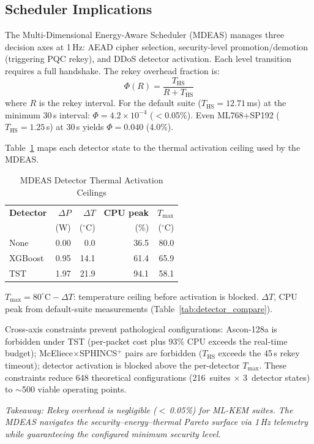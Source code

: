 \subsection{Scheduler Implications}
\label{sec:scheduler}

The Multi-Dimensional Energy-Aware Scheduler (MDEAS) manages three
decision axes at 1\,Hz: AEAD cipher selection, security-level
promotion/demotion (triggering PQC rekey), and DDoS detector
activation.  Each level transition requires a full handshake.
The rekey overhead fraction is:
\begin{equation}
\Phi(R) = \frac{T_\text{HS}}{R + T_\text{HS}}
\label{eq:rekey}
\end{equation}
where $R$ is the rekey interval.  For the default suite
($T_\text{HS} = 12.71$\,ms) at the minimum 30\,s interval:
$\Phi = 4.2 \times 10^{-4}$ ($<$0.05\%).  Even ML768+SP192
($T_\text{HS} = 1.25$\,s) at 30\,s yields $\Phi = 0.040$
(4.0\%).

Table~\ref{tab:detector_overhead} maps each detector state to the
thermal activation ceiling used by the MDEAS.

\begin{table}[t]
\centering
\caption{MDEAS Detector Thermal Activation Ceilings}
\label{tab:detector_overhead}
\footnotesize
\begin{tabular}{@{}lrrrr@{}}
\toprule
\textbf{Detector} &
  \textbf{$\Delta P$} & \textbf{$\Delta T$} &
  \textbf{CPU peak} & \textbf{$T_\text{max}$} \\
& (W) & ($^\circ$C) & (\%) & ($^\circ$C) \\
\midrule
None    & 0.00 & 0.0  & 36.5  & 80.0 \\
XGBoost & 0.95 & 14.1 & 61.4  & 65.9 \\
TST     & 1.97 & 21.9 & 94.1  & 58.1 \\
\bottomrule
\end{tabular}
\begin{tablenotes}
\footnotesize
\item $T_\text{max} = 80^\circ\text{C} - \Delta T$: temperature
  ceiling before activation is blocked.
  $\Delta T$, CPU peak from default-suite measurements
  (Table~\ref{tab:detector_compare}).
\end{tablenotes}
\end{table}

Cross-axis constraints prevent pathological configurations:
Ascon-128a is forbidden under TST (per-packet cost plus 93\% CPU
exceeds the real-time budget); McEliece$\times$SPHINCS$^+$ pairs
are forbidden ($T_\text{HS}$ exceeds the 45\,s rekey timeout);
detector activation is blocked above the per-detector $T_\text{max}$.
These constraints reduce 648 theoretical configurations
(216~suites $\times$ 3~detector states) to $\sim$500 viable
operating points.

\emph{Takeaway: Rekey overhead is negligible ($<$\,0.05\%) for
ML-KEM suites.  The MDEAS navigates the security--energy--thermal
Pareto surface via 1\,Hz telemetry while guaranteeing the
configured minimum security level.}
